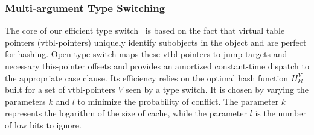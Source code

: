 \subsubsection{Multi-argument Type Switching}
\label{sec:multiarg}

The core of our efficient type switch~\cite{TS12} is based on the fact that 
virtual table pointers (vtbl-pointers) uniquely identify subobjects 
in the object and are perfect for hashing. Open type switch maps these 
vtbl-pointers to jump targets and necessary this-pointer offsets and provides an 
amortized constant-time dispatch to the appropriate case clause. Its 
efficiency relies on the optimal hash function $H_{kl}^V$ built for a set of 
vtbl-pointers $V$ seen by a type switch. It is chosen by varying the parameters $k$ 
and $l$ to minimize the probability of conflict. The parameter $k$ represents the 
logarithm of the size of cache, while the parameter $l$ is the number of 
low bits to ignore.


